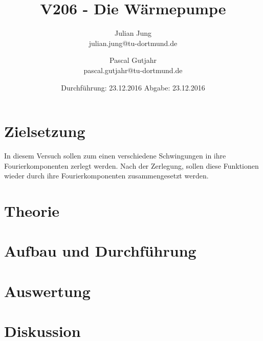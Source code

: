 

\title{V206 - Die Wärmepumpe}
\author{Julian Jung \\ julian.jung@tu-dortmund.de
  \and Pascal Gutjahr \\ pascal.gutjahr@tu-dortmund.de}
  \date{Durchführung: 23.12.2016
  \hspace{3em}
  Abgabe: 23.12.2016}
  
\maketitle
\newpage
\tableofcontents
\newpage
\section{Zielsetzung}
In diesem Versuch sollen zum einen verschiedene Schwingungen in ihre
Fourierkomponenten zerlegt werden. Nach der Zerlegung, sollen diese Funktionen
wieder durch ihre Fourierkomponenten zusammengesetzt werden.
\section{Theorie}
 
\section{Aufbau und Durchführung}
 
\section{Auswertung}
\section{Diskussion}
\printbibliography

